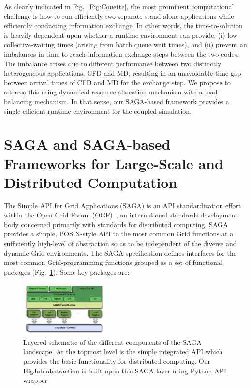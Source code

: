 \documentclass[conference,final]{IEEEtran}
\newcommand{\Nkimnote}[1]{ {\textcolor{green} { ***Nkim: #1 }}}
\newcommand{\Nkimnote}[1]{}
\begin{document}
As clearly indicated in Fig.~\ref{Fig:Couette}, the most prominent computational challenge is how to run efficiently two separate stand alone applications while efficiently conducting information exchange.  In other words, the time-to-solution is heavily dependent upon whether a runtime environment can provide, (i) low collective-waiting times (arising from batch queue wait times), and (ii) prevent an imbalances in time to reach information exchange steps between the two codes.  The imbalance arises due to different performance between two distinctly heterogeneous applications, CFD and MD, resulting in an unavoidable time gap between arrival times of CFD and MD for the exchange step.  We propose to address this using dynamical resource allocation mechanism with a load-balancing mechanism.  In that sense, our SAGA-based framework provides a single efficient runtime environment for the coupled simulation.



\section{SAGA and SAGA-based Frameworks for Large-Scale and Distributed Computation}

The Simple API for Grid Applications (SAGA) is an API standardization effort within the Open Grid Forum (OGF)~\cite{ogf_web}, an international standards development body concerned primarily with standards for distributed computing.  SAGA provides a simple, POSIX-style API to the most common Grid functions at a sufficiently high-level of abstraction so as to be %
independent of the diverse and dynamic Grid environments. The SAGA specification defines interfaces for the most common Grid-programming functions grouped as a set of functional packages (Fig.~\ref{Fig:SAGA1}). Some key packages are:

\begin{figure}[!ht]
 \begin{center}
     \includegraphics[width=0.40\textwidth]{stci_saga_figures-1.pdf}
 \end{center}
\caption{\small Layered schematic of the different components
  of the SAGA landscape. At the topmost level is the simple integrated API which provides the basic functionality for distributed computing. Our BigJob abstraction is built upon this SAGA layer using Python API wrapper} \label{Fig:SAGA1}
\end{figure}
\end{document}
